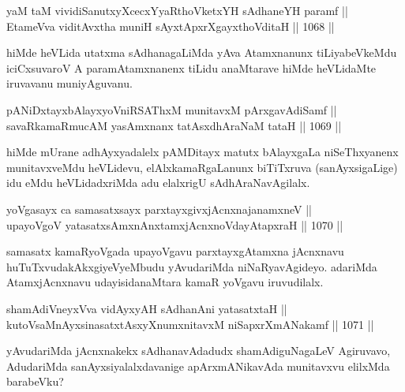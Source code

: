
\begin{shl}
yaM taM vividiSanutxyXcecxYyaRthoVketxYH sAdhaneYH paramf || \\
EtameVva viditAvx\s tha muniH sAyxtApxrXgayxthoVditaH \hfill || 1068 || 
\end{shl}

\begin{artha}
hiMde heVLida utatxma sAdhanagaLiMda yAva Atamxnanunx tiLiyabeVkeMdu iciCxsuvaroV A paramAtamxnanenx tiLidu anaMtarave hiMde heVLidaMte iruvavanu muniyAguvanu.
\end{artha}


\begin{shl}
pANiDxtayxbAlayxyoVniRSAThxM munitavxM pArxgavAdiSamf || \\
savaRkamaRmucAM yasAmxnanx tatAsxdhAraNaM tataH \hfill || 1069 ||  
\end{shl}

\begin{artha}
hiMde mUrane adhAyxyadalelx pAMDitayx matutx bAlayxgaLa niSeThxyanenx munitavxveMdu heVLidevu, elAlxkamaRgaLanunx biTiTxruva (sanAyxsigaLige) idu eMdu heVLidadxriMda adu elalxrigU sAdhAraNavAgilalx.
\end{artha}


\begin{shl}
yoVgasayx ca samasatxsayx parxtayxgivxjAcnxnajanamxneV || \\
upayoVgoV yatasatxsAmxnAnx\s \s tamxjAcnxnoVdayAtapxraH \hfill || 1070 ||  
\end{shl}

\begin{artha}
samasatx kamaRyoVgada upayoVgavu parxtayxgAtamxna jAcnxnavu huTuTxvudakAkxgiyeVyeMbudu yAvudariMda niNaRyavAgideyo. adariMda AtamxjAcnxnavu udayisidanaMtara kamaR yoVgavu iruvudilalx.
\end{artha}

\begin{shl}
shamAdiVneyxVva vidAyxyAH sAdhanAni yatasatxtaH || \\
kutoV\s saMnAyxsinasatxtAsxyXnumxnitavxM niSapxrXmANakamf \hfill || 1071 ||  
\end{shl}

\begin{artha}
yAvudariMda jAcnxnakekx sAdhanavAdadudx shamAdiguNagaLeV Agiruvavo, AdudariMda sanAyxsiyalalxdavanige apArxmANikavAda munitavxvu elilxMda barabeVku?
\end{artha}

